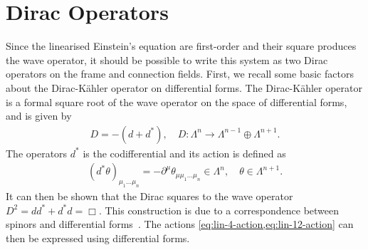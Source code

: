 \documentclass[10pt]{report}
\theoremstyle{definition}
\begin{document}
    \section{Dirac Operators}\label{subsec:pleb-dirac-operators}
        Since the linearised Einstein's equation are first-order and their square produces the wave operator, it should be possible to write this system as two Dirac operators on the frame and connection fields. First, we recall some basic factors about the Dirac-K\"ahler operator on differential forms. The Dirac-K\"ahler operator is a formal square root of the wave operator on the space of differential forms, and is given by
        \begin{align}
            D = -(d + d^*), \quad D : \Lambda^n \rightarrow \Lambda^{n-1} \oplus \Lambda^{n+1}.
        \end{align}
        The operators $d^*$ is the codifferential and its action is defined as
        \begin{align}
            (d^* \theta)_{\mu_1...\mu_n} = - \partial^\mu \theta_{\mu \mu_1...\mu_n} \in \Lambda^n, \quad \theta \in \Lambda^{n+1}.
        \end{align}
        It can then be shown that the Dirac squares to the wave operator $D^2 = d d^* + d^* d = \Box$. This construction is due to a correspondence between spinors and differential forms~\cite{AIHPA_1978__29_1_85_0}. The actions \cref{eq:lin-4-action,eq:lin-12-action} can then be expressed using differential forms.
\end{document}
